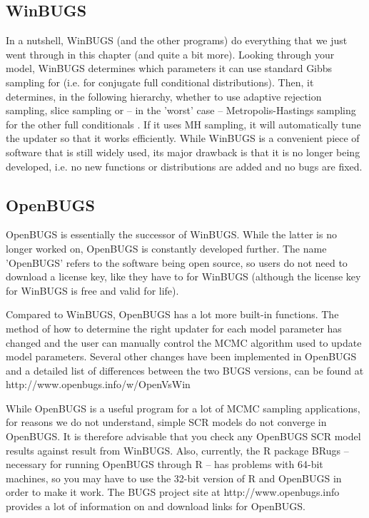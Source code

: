 \subsection{WinBUGS}
In a nutshell, WinBUGS (and the other programs) do everything that we just went through in this chapter (and quite a bit more). Looking through your model, WinBUGS determines which parameters it can use standard Gibbs sampling for (i.e. for conjugate full conditional distributions). Then, it determines, in the following hierarchy, whether to use adaptive rejection sampling, slice sampling or – in the 'worst' case – Metropolis-Hastings sampling for the other full conditionals \citep{spiegelhalter_etal:2003}. If it uses MH sampling, it will automatically tune the updater so that it works efficiently.
While WinBUGS is a convenient piece of software that is still widely used, its major drawback is that it is no longer being developed, i.e. no new functions or distributions are added and no bugs are fixed.

\subsection{OpenBUGS}
OpenBUGS is essentially the successor of WinBUGS. While the latter is
no longer worked on, OpenBUGS is constantly developed further. The
name 'OpenBUGS' refers to the software being open source, so users do
not need to download a license key, like they have to for WinBUGS
(although the license key for WinBUGS is free and valid for life).

Compared to WinBUGS, OpenBUGS has a lot more built-in functions. The
method of how to determine the right updater for each model parameter
has changed and the user can manually control the MCMC algorithm used
to update model parameters.  Several other changes have been
implemented in OpenBUGS and a detailed list of differences between the
two BUGS versions, can be found at
http://www.openbugs.info/w/OpenVsWin

While OpenBUGS is a useful program for a lot of MCMC sampling
applications, for reasons we do not understand, simple SCR models do
not converge in OpenBUGS. It is therefore advisable that you check any
OpenBUGS SCR model results against result from WinBUGS. Also,
currently, the R package BRugs \citep{thomas_etal:2006} – necessary
for running OpenBUGS through R – has problems with 64-bit machines, so
you may have to use the 32-bit version of R and OpenBUGS in order to
make it work. The BUGS project site at http://www.openbugs.info
provides a lot of information on and download links for OpenBUGS.

